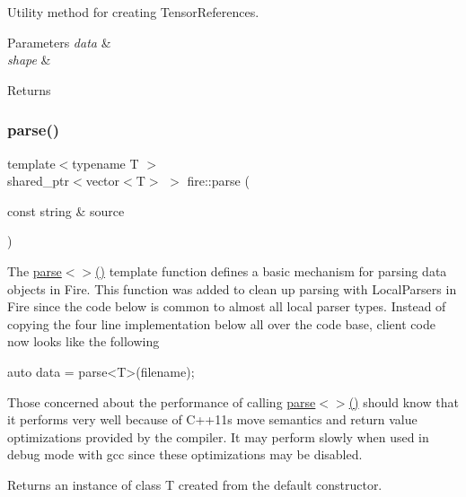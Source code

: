 Utility method for creating Tensor\+References.


\begin{DoxyParams}{Parameters}
{\em data} & \\
\hline
{\em shape} & \\
\hline
\end{DoxyParams}
\begin{DoxyReturn}{Returns}

\end{DoxyReturn}
\mbox{\label{a00171_a2b47cfd8a5d8711cdc55e1397487b90b}} 
\subsubsection{\texorpdfstring{parse()}{parse()}}
{\footnotesize\ttfamily template$<$typename T $>$ \\
shared\+\_\+ptr$<$vector$<$T$>$ $>$ fire\+::parse (\begin{DoxyParamCaption}\item[{const string \&}]{source }\end{DoxyParamCaption})}

The \hyperlink{a00171_a2b47cfd8a5d8711cdc55e1397487b90b}{parse$<$$>$()} template function defines a basic mechanism for parsing data objects in Fire. This function was added to clean up parsing with Local\+Parsers in Fire since the code below is common to almost all local parser types. Instead of copying the four line implementation below all over the code base, client code now looks like the following 
\begin{DoxyCode}
\textcolor{keyword}{auto} data = parse<T>(filename);
\end{DoxyCode}


Those concerned about the performance of calling \hyperlink{a00171_a2b47cfd8a5d8711cdc55e1397487b90b}{parse$<$$>$()} should know that it performs very well because of C++11\textquotesingle{}s move semantics and return value optimizations provided by the compiler. It may perform slowly when used in debug mode with gcc since these optimizations may be disabled.

\begin{DoxyReturn}{Returns}
an instance of class T created from the default constructor. 
\end{DoxyReturn}
\mbox{\label{a00171_ac3f0360fae13ec5b8b93251c695e1821}} 
